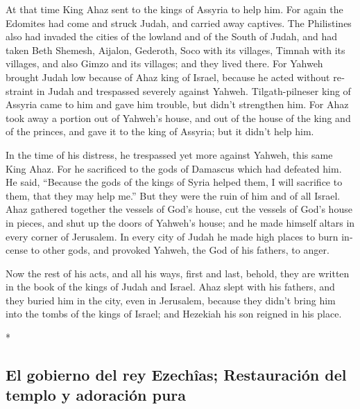 \begin{paracol}{2}
\begin{otherlanguage}{english}
 At that time King Ahaz sent to the kings of Assyria to
help him.  For again the Edomites had come and struck
Judah, and carried away captives.  The Philistines also
had invaded the cities of the lowland and of the South of Judah, and had
taken Beth Shemesh, Aijalon, Gederoth, Soco with its villages, Timnah
with its villages, and also Gimzo and its villages; and they lived
there.  For Yahweh brought Judah low because of Ahaz king
of Israel, because he acted without restraint in Judah and trespassed
severely against Yahweh.  Tilgath-pilneser king of
Assyria came to him and gave him trouble, but didn't strengthen him.
 For Ahaz took away a portion out of Yahweh's house, and
out of the house of the king and of the princes, and gave it to the king
of Assyria; but it didn't help him.

 In the time of his distress, he trespassed yet more
against Yahweh, this same King Ahaz.  For he sacrificed
to the gods of Damascus which had defeated him. He said, ``Because the
gods of the kings of Syria helped them, I will sacrifice to them, that
they may help me.'' But they were the ruin of him and of all Israel.
 Ahaz gathered together the vessels of God's house, cut
the vessels of God's house in pieces, and shut up the doors of Yahweh's
house; and he made himself altars in every corner of Jerusalem.
 In every city of Judah he made high places to burn
incense to other gods, and provoked Yahweh, the God of his fathers, to
anger.

 Now the rest of his acts, and all his ways, first and
last, behold, they are written in the book of the kings of Judah and
Israel.  Ahaz slept with his fathers, and they buried him
in the city, even in Jerusalem, because they didn't bring him into the
tombs of the kings of Israel; and Hezekiah his son reigned in his place.

\end{otherlanguage}

\switchcolumn[0]*

\hypertarget{el-gobierno-del-rey-ezechuxeeas-restauraciuxf3n-del-templo-y-adoraciuxf3n-pura}{%
\subsection{El gobierno del rey Ezechîas; Restauración del templo y
adoración
pura}\label{el-gobierno-del-rey-ezechuxeeas-restauraciuxf3n-del-templo-y-adoraciuxf3n-pura}}


\end{paracol}
